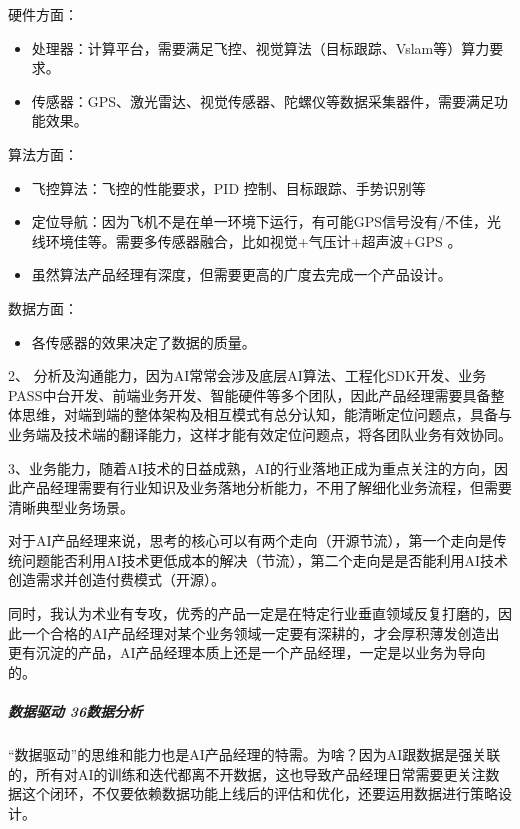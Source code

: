 \documentclass[letterpaper,10pt,english]{sphinxmanual}
\begin{document}

硬件方面：
\begin{itemize}
\item {} 
处理器：计算平台，需要满足飞控、视觉算法（目标跟踪、Vslam等）算力要求。

\item {} 
传感器：GPS、激光雷达、视觉传感器、陀螺仪等数据采集器件，需要满足功能效果。

\end{itemize}

算法方面：
\begin{itemize}
\item {} 
飞控算法：飞控的性能要求，PID 控制、目标跟踪、手势识别等

\item {} 
定位导航：因为飞机不是在单一环境下运行，有可能GPS信号没有/不佳，光线环境佳等。需要多传感器融合，比如视觉+气压计+超声波+GPS
。

\item {} 
虽然算法产品经理有深度，但需要更高的广度去完成一个产品设计。

\end{itemize}

数据方面：
\begin{itemize}
\item {} 
各传感器的效果决定了数据的质量。

\end{itemize}

2、
分析及沟通能力，因为AI常常会涉及底层AI算法、工程化SDK开发、业务PASS中台开发、前端业务开发、智能硬件等多个团队，因此产品经理需要具备整体思维，对端到端的整体架构及相互模式有总分认知，能清晰定位问题点，具备与业务端及技术端的翻译能力，这样才能有效定位问题点，将各团队业务有效协同。

3、业务能力，随着AI技术的日益成熟，AI的行业落地正成为重点关注的方向，因此产品经理需要有行业知识及业务落地分析能力，不用了解细化业务流程，但需要清晰典型业务场景。

对于AI产品经理来说，思考的核心可以有两个走向（开源节流），第一个走向是传统问题能否利用AI技术更低成本的解决（节流），第二个走向是是否能利用AI技术创造需求并创造付费模式（开源）。

同时，我认为术业有专攻，优秀的产品一定是在特定行业垂直领域反复打磨的，因此一个合格的AI产品经理对某个业务领域一定要有深耕的，才会厚积薄发创造出更有沉淀的产品，AI产品经理本质上还是一个产品经理，一定是以业务为导向的。


\subparagraph{数据驱动 36\sphinxfootnotemark[280] 数据分析}
\label{\detokenize{chapter_introduction/AI_PM:data-analysis}}%
\begin{footnotetext}[280]\sphinxAtStartFootnote
{}
%
\end{footnotetext}\ignorespaces 
“数据驱动”的思维和能力也是AI产品经理的特需。为啥？因为AI跟数据是强关联的，所有对AI的训练和迭代都离不开数据，这也导致产品经理日常需要更关注数据这个闭环，不仅要依赖数据功能上线后的评估和优化，还要运用数据进行策略设计。
\end{document}
